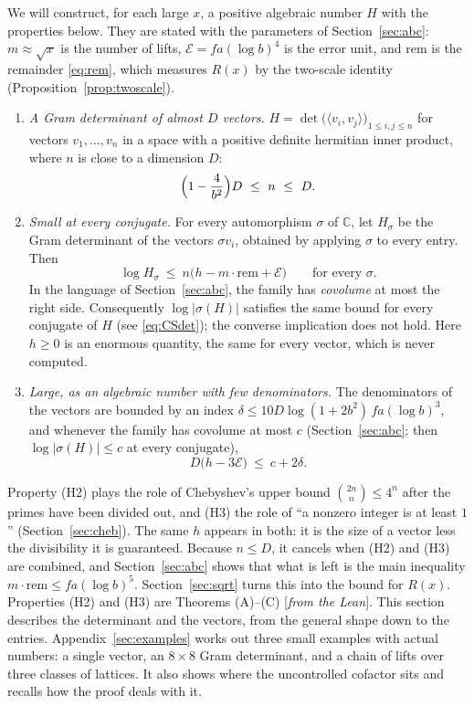 \documentclass[11pt]{amsart}
\numberwithin{equation}{section}
\theoremstyle{definition}
\theoremstyle{remark}
\newcommand{\C}{\mathbb C}
\newcommand{\status}[1]{\textup{[\emph{#1}]}}
\begin{document}
We will construct, for each large $x$, a positive algebraic number $H$ with the properties below. They are stated with the parameters of Section~\ref{sec:abc}: $m\approx\sqrt x$ is the number of lifts, $\mathcal E=fa(\log b)^4$ is the error unit, and $\mathrm{rem}$ is the remainder \eqref{eq:rem}, which measures $R(x)$ by the two-scale identity (Proposition~\ref{prop:twoscale}).
\begin{enumerate}[label=(H\arabic*),leftmargin=3.2em]
\item \emph{A Gram determinant of almost $D$ vectors.} $H=\det\bigl(\langle v_i,v_j\rangle\bigr)_{1\le i,j\le n}$ for vectors $v_1,\dots,v_n$ in a space with a positive definite hermitian inner product, where $n$ is close to a dimension $D$:
\begin{equation}\label{eq:Hn}
 \Bigl(1-\frac4{b^2}\Bigr)D\ \le\ n\ \le\ D .
\end{equation}
\item \emph{Small at every conjugate.} For every automorphism $\sigma$ of $\C$, let $H_\sigma$ be the Gram determinant of the vectors $\sigma v_i$, obtained by applying $\sigma$ to every entry. Then
\begin{equation}\label{eq:Hsmall}
 \log H_\sigma\ \le\ n\bigl(h-m\cdot\mathrm{rem}+\mathcal E\bigr)\qquad\text{for every }\sigma .
\end{equation}
In the language of Section~\ref{sec:abc}, the family has \emph{covolume} at most the right side. Consequently $\log|\sigma(H)|$ satisfies the same bound for every conjugate of $H$ (see \eqref{eq:CSdet}); the converse implication does not hold. Here $h\ge0$ is an enormous quantity, the same for every vector, which is never computed.
\item \emph{Large, as an algebraic number with few denominators.} The denominators of the vectors are bounded by an index $\delta\le10D\log(1+2b^2)\,fa(\log b)^3$, and whenever the family has covolume at most $c$ (Section~\ref{sec:abc}; then $\log|\sigma(H)|\le c$ at every conjugate),
\begin{equation}\label{eq:Hlarge}
 D\bigl(h-3\mathcal E\bigr)\ \le\ c+2\delta .
\end{equation}
\end{enumerate}
Property (H2) plays the role of Chebyshev's upper bound $\binom{2n}n\le4^n$ after the primes have been divided out, and (H3) the role of ``a nonzero integer is at least $1$'' (Section~\ref{sec:cheb}). The same $h$ appears in both: it is the size of a vector less the divisibility it is guaranteed. Because $n\le D$, it cancels when (H2) and (H3) are combined, and Section~\ref{sec:abc} shows that what is left is the main inequality $m\cdot\mathrm{rem}\le fa(\log b)^5$. Section~\ref{sec:sqrt} turns this into the bound for $R(x)$. Properties (H2) and (H3) are Theorems (A)--(C) \status{from the Lean}. This section describes the determinant and the vectors, from the general shape down to the entries. Appendix~\ref{sec:examples} works out three small examples with actual numbers: a single vector, an $8\times8$ Gram determinant, and a chain of lifts over three classes of lattices. It also shows where the uncontrolled cofactor sits and recalls how the proof deals with it.
\end{document}
